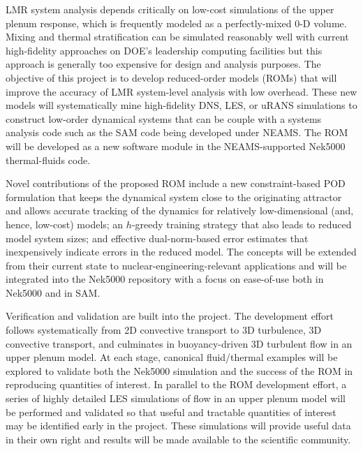 LMR system analysis depends critically on low-cost simulations of the upper plenum response, which is frequently modeled as a perfectly-mixed 0-D volume. Mixing and thermal stratification can be simulated reasonably well with current high-fidelity approaches on DOE's leadership computing facilities but this approach is generally too expensive for design and analysis purposes. The objective of this project is to develop reduced-order models (ROMs) that will improve the accuracy of LMR system-level analysis with low overhead. These new models will systematically mine high-fidelity DNS, LES, or uRANS simulations to construct low-order dynamical systems that can be couple with a systems analysis code such as the SAM code being developed under NEAMS. The ROM will be developed as a new software module in the NEAMS-supported Nek5000 thermal-fluids code.

Novel contributions of the proposed ROM include a new constraint-based POD formulation that keeps the dynamical system close to the originating attractor and allows accurate tracking of the dynamics for relatively low-dimensional (and, hence, low-cost) models; an $h$-greedy training strategy that also leads to reduced model system sizes; and effective dual-norm-based error estimates that inexpensively indicate errors in the reduced model. The concepts will be extended from their current state to nuclear-engineering-relevant applications and will be integrated into the Nek5000 repository with a focus on ease-of-use both in Nek5000 and in SAM.

Verification and validation are built into the project. The development effort follows systematically from 2D convective transport to 3D turbulence, 3D convective transport, and culminates in buoyancy-driven 3D turbulent flow in an upper plenum model. At each stage, canonical fluid/thermal examples will be explored to validate both the Nek5000 simulation and the success of the ROM in reproducing quantities of interest. In parallel to the ROM development effort, a series of highly detailed LES simulations of flow in an upper plenum model will be performed and validated so that useful and tractable quantities of interest may be identified early in the project.  These simulations will provide useful data in their own right and results will be made available to the scientific community. 
